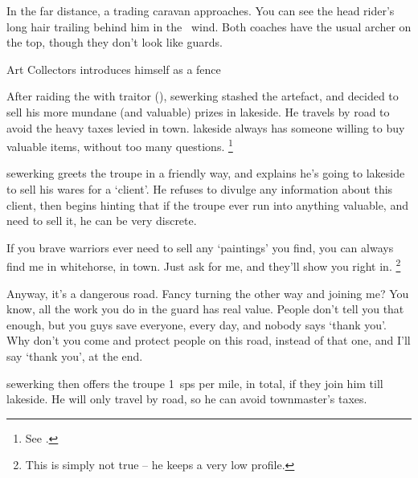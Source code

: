 \begin{boxtext}
  In the far distance, a trading caravan approaches.
  You can see the head rider's long hair trailing behind him in the \showTemperature\ wind.
  Both coaches have the usual archer on the top, though they don't look like \glspl{guard}.
\end{boxtext}

{Art Collectors}%
{ introduces himself as a fence}%

\begin{exampletext}
  After raiding the  with \gls{traitor} (), \gls{sewerking} stashed the \gls{artefact}, and decided to sell his more mundane (and valuable) prizes in \gls{lakeside}.
  He travels by road to avoid the heavy taxes levied in \gls{town}.%
  \Gls{lakeside} always has someone willing to buy valuable items, without too many questions.%
  \footnote{See .}
\end{exampletext}

\setcounter{wounds}{2}

\sewerking


\Gls{sewerking} greets the troupe in a friendly way, and explains he's going to \gls{lakeside} to sell his wares for a `client'.
He refuses to divulge any information about this client, then begins hinting that if the troupe ever run into anything valuable, and need to sell it, he can be very discrete.

\begin{speechtext}
  If you brave warriors ever need to sell any `paintings' you find, you can always find me in \gls{whitehorse}, in \gls{town}.
  Just ask for me, and they'll show you right in.%
  \footnote{This is simply not true -- he keeps a very low profile.}

  Anyway, it's a dangerous road.
  Fancy turning the other way and joining me?
  You know, all the work you do in the \gls{guard} has real value.
  People don't tell you that enough, but you guys save everyone, every day, and nobody says `thank you'.
  Why don't you come and protect people on this road, instead of that one, and I'll say `thank you', at the end.
\end{speechtext}

\Gls{sewerking} then offers the troupe 1~\glspl{sp} per mile, in total, if they join him till \gls{lakeside}.
He will only travel by road, so he can avoid \gls{townmaster}'s taxes.

